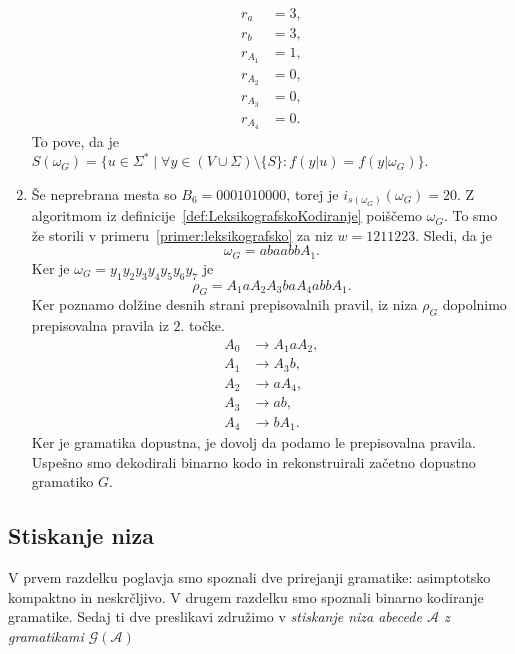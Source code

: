 \documentclass[fin1, tisk]{fmfdelo}
\newcommand{\A}{\mathcal{A}}
\newcommand{\G}{\mathcal{G}}
\theoremstyle{definition}
\begin{document}
\begin{primer}
\begin{enumerate}
        \begin{align*}
            r_a &= 3,\\
            r_b &= 3,\\
            r_{A_1} &= 1,\\
            r_{A_2} &= 0,\\
            r_{A_3} &= 0,\\
            r_{A_4} &= 0.
        \end{align*}
        To pove, da je $S(\omega_G) = \bigl\{ u \in \Sigma^* \mid \forall y \in (V \cup \Sigma) 
        \setminus \{ S \} \colon f(y|u) = f(y|\omega_G) \bigr\}$.
        \item Še neprebrana mesta so $B_6 = 0001010000$, torej je $i_{s(\omega_G)}(\omega_G) = 20$.
        Z algoritmom iz definicije~\ref{def:LeksikografskoKodiranje} poiščemo $\omega_G$. To smo 
        že storili v primeru~\ref{primer:leksikografsko} za niz $w = 1211223$. Sledi, da je
        \[
            \omega_G = abaabbA_1.
        \]
        Ker je $\omega_G = y_1y_2y_3y_4y_5y_6y_7$ je
        \[
            \rho_G = A_1aA_2A_3baA_4abbA_1.
        \]
        Ker poznamo dolžine desnih strani prepisovalnih pravil, iz niza $\rho_G$ dopolnimo 
        prepisovalna pravila iz $2.$ točke.
        \begin{align*}
            A_0 &\rightarrow A_1aA_2, \\
            A_1 &\rightarrow A_3b, \\
            A_2 &\rightarrow aA_4, \\
            A_3 &\rightarrow ab, \\
            A_4 &\rightarrow bA_1.
        \end{align*}
        Ker je gramatika dopustna, je dovolj da podamo le prepisovalna pravila. Uspešno smo
        dekodirali binarno kodo in rekonstruirali začetno dopustno gramatiko $G$.
    \end{enumerate}
\end{primer}

\subsection{Stiskanje niza}\label{subsection:StiskanjeNiza}

V prvem razdelku poglavja smo spoznali dve prirejanji gramatike: asimptotsko kompaktno in neskrčljivo.
V drugem razdelku smo spoznali binarno kodiranje gramatike. Sedaj ti dve preslikavi združimo v  
\emph{stiskanje niza abecede $\A$ z gramatikami $\G(\A)$}
\end{document}
